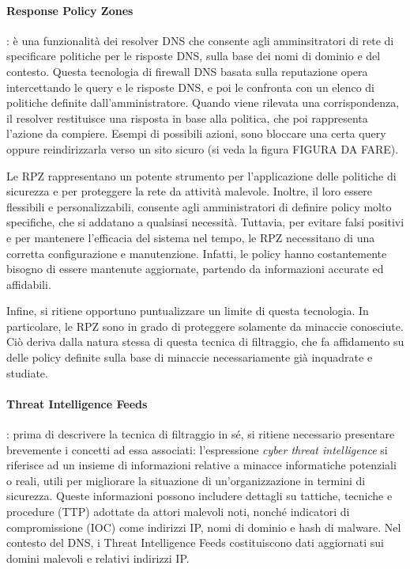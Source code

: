 \paragraph{Response Policy Zones}: è una funzionalità dei resolver DNS che consente agli amminsitratori di rete di specificare politiche per le risposte DNS, sulla base dei nomi di dominio e del contesto. Questa tecnologia di firewall DNS basata sulla reputazione opera intercettando le query e le risposte DNS, e poi le confronta con un elenco di politiche definite dall'amministratore. Quando viene rilevata una corrispondenza, il resolver restituisce una risposta in base alla politica, che poi rappresenta l'azione da compiere. Esempi di possibili azioni, sono bloccare una certa query oppure reindirizzarla verso un sito sicuro (si veda la figura FIGURA DA FARE).

Le RPZ rappresentano un potente strumento per l'applicazione delle politiche di sicurezza e per proteggere la rete da attività malevole. Inoltre, il loro essere flessibili e personalizzabili, consente agli amministratori di definire policy molto specifiche, che si addatano a qualsiasi necessità. Tuttavia, per evitare falsi positivi e per mantenere l'efficacia del sistema nel tempo, le RPZ necessitano di una corretta configurazione e manutenzione. Infatti, le policy hanno costantemente bisogno di essere mantenute aggiornate, partendo da informazioni accurate ed affidabili.

Infine, si ritiene opportuno puntualizzare un limite di questa tecnologia. In particolare, le RPZ sono in grado di proteggere solamente da minaccie conosciute. Ciò deriva dalla natura stessa di questa tecnica di filtraggio, che fa affidamento su delle policy definite sulla base di minaccie necessariamente già inquadrate e studiate.

\paragraph{Threat Intelligence Feeds}: prima di descrivere la tecnica di filtraggio in sé, si ritiene necessario presentare brevemente i concetti ad essa associati: l'espressione \textit{cyber threat intelligence} si riferisce ad un insieme di informazioni relative a minacce informatiche potenziali o reali, utili per migliorare la situazione di un'organizzazione in termini di sicurezza. Queste informazioni possono includere dettagli su tattiche, tecniche e procedure (TTP) adottate da attori malevoli noti, nonché indicatori di compromissione (IOC) come indirizzi IP, nomi di dominio e hash di malware. Nel contesto del DNS, i Threat Intelligence Feeds costituiscono dati aggiornati sui domini malevoli e relativi indirizzi IP.

